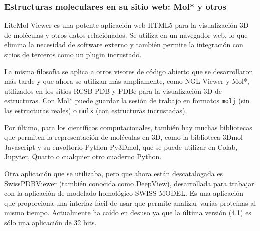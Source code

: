 \subsubsection{Estructuras moleculares en su sitio web: Mol* y otros}
LiteMol Viewer es una potente aplicación web HTML5 para la visualización 3D de moléculas y otros datos relacionados. Se utiliza en un navegador web, lo que elimina la necesidad de software externo y también permite la integración con sitios de terceros como un plugin incrustado. 

La misma filosofía se aplica a otros visores de código abierto que se desarrollaron más tarde y que ahora se utilizan más ampliamente, como NGL Viewer y Mol*, utilizados en los sitios RCSB-PDB y PDBe para la visualización 3D de estructuras. Con Mol* puede guardar la sesión de trabajo en formatos \texttt{molj} (sin las estructuras reales) o \texttt{molx} (con estructuras incrustadas).

Por último, para los científicos computacionales, también hay muchas bibliotecas que permiten la representación de moléculas en 3D, como la biblioteca 3Dmol Javascript y su envoltorio Python Py3Dmol, que se puede utilizar en Colab, Jupyter, Quarto o cualquier otro cuaderno Python.

Otra aplicación que se utilizaba, pero que ahora están descatalogada es SwissPDBViewer (también conocida como DeepView), desarrollada para trabajar con la aplicación de modelado homológico SWISS-MODEL. Es una aplicación que proporciona una interfaz fácil de usar que permite analizar varias proteínas al mismo tiempo. Actualmente ha caído en desuso ya que la última versión (4.1) es sólo una aplicación de 32 bits.

